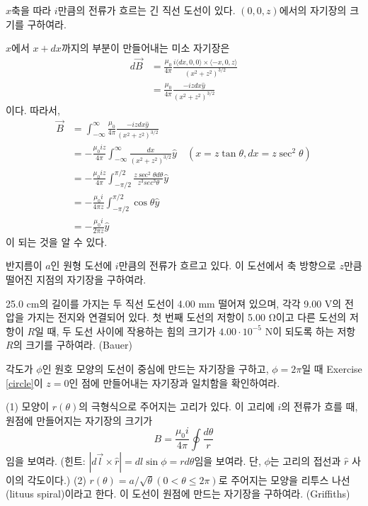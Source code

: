 \begin{example}\label{longwireB} 
$x$축을 따라 $i$만큼의 전류가 흐르는 긴 직선 도선이 있다. $(0,0,z)$에서의 자기장의 크기를 구하여라.
\end{example}
$x$에서 $x+dx$까지의 부분이 만들어내는 미소 자기장은 
\begin{align}
d\vec{B}&=\frac{\mu_0}{4\pi}\frac{i\langle dx,0,0\rangle \times \langle -x,0,z\rangle}{(x^2+z^2)^{3/2}}\\
&= \frac{\mu_0}{4\pi}\frac{-izdx\hat{y}}{(x^2+z^2)^{3/2}}
\end{align}
이다. 따라서,
\begin{align}
\vec{B} &= \int_{-\infty}^\infty \frac{\mu_0}{4\pi}\frac{-izdx\hat{y}}{(x^2+z^2)^{3/2}}\\
&= -\frac{\mu_0iz}{4\pi}\int_{-\infty}^\infty  \frac{dx}{(x^2+z^2)^{3/2}}\hat{y}\quad(x=z\tan\theta, dx = z\sec^2 \theta)\\
&= -\frac{\mu_0iz}{4\pi} \int_{-\pi/2}^{\pi/2} \frac{z\sec^2 \theta d\theta}{z^3 sec^3\theta}\hat{y}\\
&=-\frac{\mu_0i}{4\pi z} \int_{-\pi/2}^{\pi/2} \cos\theta \hat{y}\\
&= -\frac{\mu_0i}{2\pi z}\hat{y}
\end{align}
이 되는 것을 알 수 있다.
\begin{exercise}\label{circle}
반지름이 $a$인 원형 도선에 $i$만큼의 전류가 흐르고 있다. 이 도선에서 축 방향으로 $z$만큼 떨어진 지점의 자기장을 구하여라.
\end{exercise}

\begin{problem}
25.0 cm의 길이를 가지는 두 직선 도선이 4.00 mm 떨어져 있으며, 각각 9.00 V의 전압을 가지는 전지와 연결되어 있다. 첫 번째 도선의 저항이 5.00 Ω이고 다른 도선의 저항이 $R$일 때, 두 도선 사이에 작용하는 힘의 크기가 $4.00\cdot 10^{-5}$ N이 되도록 하는 저항 $R$의 크기를 구하여라. (Bauer)
\end{problem}

\begin{problem}
각도가 $\phi$인 원호 모양의 도선이 중심에 만드는 자기장을 구하고, $\phi = 2\pi$일 때 Exercise \ref{circle}이 $z=0$인 점에 만들어내는 자기장과 일치함을 확인하여라.
\end{problem}
\begin{problem}
(1) 모양이 $r(\theta)$의 극형식으로 주어지는 고리가 있다. 이 고리에 $i$의 전류가 흐를 때, 원점에 만들어지는 자기장의 크기가
\begin{equation}
B=\frac{\mu_0i}{4\pi}\oint \frac{d\theta}{r}
\end{equation}
임을 보여라. (힌트: $|d\vec{l}\times \hat{r}|=dl\sin\phi =rd\theta$임을 보여라. 단, $\phi$는 고리의 접선과 $\hat{r}$ 사이의 각도이다.) (2) $r(\theta)=a/\sqrt{\theta}(0< \theta \le 2\pi)$로 주어지는 모양을 리투스 나선(lituus spiral)이라고 한다. 이 도선이 원점에 만드는 자기장을 구하여라. (Griffiths)
\end{problem}

